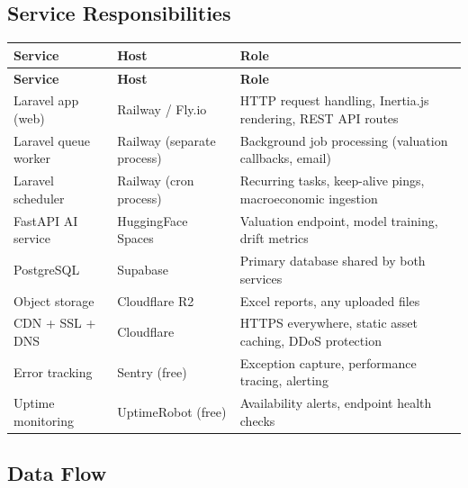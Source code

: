 \documentclass[12pt,a4paper]{report}
\begin{document}
\subsection{Service Responsibilities}

\begin{longtable}{L{3.5cm} L{3.5cm} L{6cm}}
    \toprule
    \textbf{Service} & \textbf{Host} & \textbf{Role} \\
    \midrule
    \endfirsthead
    \toprule
    \textbf{Service} & \textbf{Host} & \textbf{Role} \\
    \midrule
    \endhead
    \bottomrule
    \endlastfoot

    Laravel app (web) & Railway / Fly.io &
        HTTP request handling, Inertia.js rendering, REST API routes \\[4pt]

    Laravel queue worker & Railway (separate process) &
        Background job processing (valuation callbacks, email) \\[4pt]

    Laravel scheduler & Railway (cron process) &
        Recurring tasks, keep-alive pings, macroeconomic ingestion \\[4pt]

    FastAPI AI service & HuggingFace Spaces &
        Valuation endpoint, model training, drift metrics \\[4pt]

    PostgreSQL & Supabase &
        Primary database shared by both services \\[4pt]

    Object storage & Cloudflare R2 &
        Excel reports, any uploaded files \\[4pt]

    CDN + SSL + DNS & Cloudflare &
        HTTPS everywhere, static asset caching, DDoS protection \\[4pt]

    Error tracking & Sentry (free) &
        Exception capture, performance tracing, alerting \\[4pt]

    Uptime monitoring & UptimeRobot (free) &
        Availability alerts, endpoint health checks \\

\end{longtable}

\subsection{Data Flow}
\end{document}
